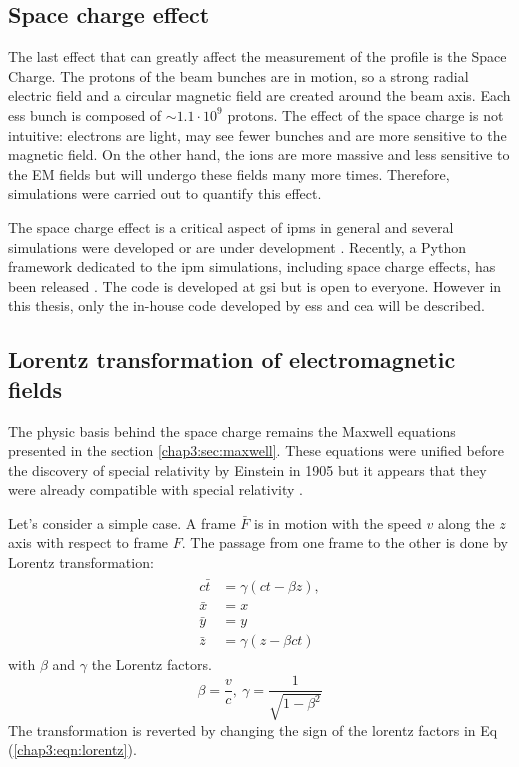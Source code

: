 \begin{refsection}
  \section{Space charge effect}
  The last effect that can greatly affect the measurement of the profile is the Space Charge. The protons of the beam bunches are in motion, so a strong radial electric field and a circular magnetic field are created around the beam axis. Each \acrshort{ess} bunch is composed of $\sim 1.1\cdot10^{9}$ protons. The effect of the space charge is not intuitive: electrons are light, may see fewer bunches and are more sensitive to the magnetic field. On the other hand, the ions are more massive and less sensitive to the EM fields but will undergo these fields many more times. Therefore, simulations were carried out to quantify this effect.

  The space charge effect is a critical aspect of \acrshort{ipm}s in general and several simulations were developed or are under development \cite{Sapinski2016,IPMcolab2019}. Recently, a Python framework dedicated to the \acrshort{ipm} simulations, including space charge effects, has been released \cite{Vilsmeier2019}. The code is developed at \acrshort{gsi} but is open to everyone. However in this thesis, only the in-house code developed by \acrshort{ess} and \acrshort{cea} will be described.

  \subsection{Lorentz transformation of electromagnetic fields}
  The physic basis behind the space charge remains the Maxwell equations presented in the section \ref{chap3:sec:maxwell}. These equations were unified before the discovery of special relativity by Einstein in 1905 but it appears that they were already compatible with special relativity \cite{feynman2011feynman}.

  Let's consider a simple case. A frame $\bar{F}$ is in motion with the speed $v$ along the $z$ axis with respect to frame $F$. The passage from one frame to the other is done by Lorentz transformation:
  \begin{align}
    \label{chap3:eqn:lorentz}
    \begin{split}
      c\bar{t} &= \gamma (ct - \beta z) ,
      \\
      \bar{x} &= x
      \\
      \bar{y} &= y
      \\
      \bar{z} &= \gamma (z - \beta ct)
    \end{split}
  \end{align}
  with $\beta$ and $\gamma$ the Lorentz factors.
  \begin{equation}
    \beta = \frac{v}{c}
    ,\
    \gamma = \frac{1}{\sqrt{1 - \beta^{2}}}
  \end{equation}
  The transformation is reverted by changing the sign of the lorentz factors in Eq (\ref{chap3:eqn:lorentz}).


\end{refsection}
